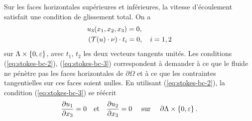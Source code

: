 Sur les faces horizontales supérieures et inférieures, la vitesse
d'écoulement satisfait une condition de glissement total. On a
\begin{align}
  &u_3(x_1, x_2, x_3) = 0,\label{eq:stokes-bc-2}\\
  &\left( \mathcal T(u)\cdot \nu \right)\cdot t_i = 0,\quad i = 1,2\label{eq:stokes-bc-3}
\end{align}
sur $\Lambda \times\left\{ 0,\varepsilon \right\}$, avec $t_1$, $t_2$ les deux
vecteurs tangents unités.
Les conditions (\ref{eq:stokes-bc-2}), (\ref{eq:stokes-bc-3})
correspondent à demander à ce que le fluide ne pénètre pas les faces
horizontales de $\partial\Omega$ et à ce que les contraintes
tangentielles sur ces faces soient nulles. En utilisant
(\ref{eq:stokes-bc-2}), la condition (\ref{eq:stokes-bc-3}) se réécrit
\begin{equation}
\frac{\partial u_1}{\partial x_3}
  = 0 \quad \text{et} \quad \frac{\partial u_2}{\partial x_3}
  = 0\quad \text{ sur }\quad\partial \Lambda \times\left\{ 0,\varepsilon \right\}.
\end{equation}

